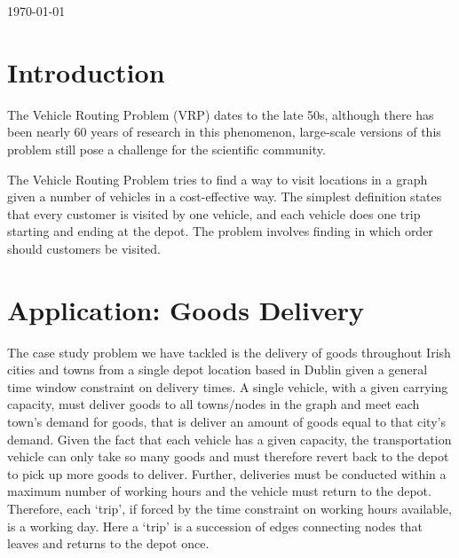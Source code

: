 \documentclass[a4paper,11pt]{article}
\begin{document}
\begin{titlepage}
{\large \today}\\[3cm] %


 

\vfill %

\end{titlepage}

\section{Introduction}
The Vehicle Routing Problem (VRP) dates to the late 50s, although there has been nearly 60 years of research in this phenomenon, large-scale versions of this problem still pose a challenge for the scientific community. 

The Vehicle Routing Problem tries to find a way to visit locations in a graph given a number of vehicles in a cost-effective way. The simplest definition states that every customer is visited by one vehicle, and each vehicle does one trip starting and ending at the depot. The problem involves finding in which order should customers be visited. 

\section{Application: Goods Delivery}
The case study problem we have tackled is the delivery of goods throughout Irish cities and towns from a single depot location based in Dublin given a general time window constraint on delivery times. A single vehicle, with a given carrying capacity, must deliver goods to all towns/nodes in the graph and meet each town's demand for goods, that is deliver an amount of goods equal to that city's demand. Given the fact that each vehicle has a given capacity, the transportation vehicle can only take so many goods and must therefore revert back to the depot to pick up more goods to deliver. Further, deliveries must be conducted within a maximum number of working hours and the vehicle must return to the depot. Therefore, each `trip', if forced by the time constraint on working hours available, is a working day. Here a `trip' is a succession of edges connecting nodes that leaves and returns to the depot once. 
\end{document}
